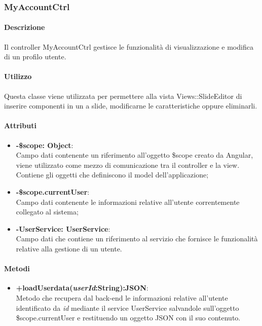 \newpage	
\subsubsection{MyAccountCtrl}
	\paragraph{Descrizione}
	Il controller MyAccountCtrl gestisce le funzionalità di visualizzazione e modifica di un profilo utente.
	
	\paragraph{Utilizzo}
	Questa classe viene utilizzata per permettere alla vista Views::SlideEditor di inserire componenti in un a slide, modificarne le caratteristiche oppure eliminarli.\\
	\paragraph{Attributi}
	\begin{itemize}
		\item \textbf{-\$scope: Object}:\\
			Campo dati contenente un riferimento all'oggetto \$scope creato da Angular, viene utilizzato come mezzo di comunicazione tra il controller e la view. Contiene gli oggetti che definiscono il model dell'applicazione;	
		\item \textbf{-\$scope.currentUser}:\\
			Campo dati contenente le informazioni relative all'utente correntemente collegato al sistema;
				
		\item \textbf{-UserService: UserService}:\\
			Campo dati che contiene un riferimento al servizio che fornisce le funzionalità relative alla gestione di un utente.
	
	\end{itemize}
	
	\paragraph{Metodi}
	\begin{itemize}
	  \item \textbf{+loadUserdata(\textit{userId}:String):JSON}:\\
		 Metodo che recupera dal back-end le informazioni relative all'utente identificato da \textit{id} mediante il service UserService salvandole sull'oggetto \$scope.currentUser e restituendo un oggetto JSON con il suo contenuto.
	\end{itemize}
